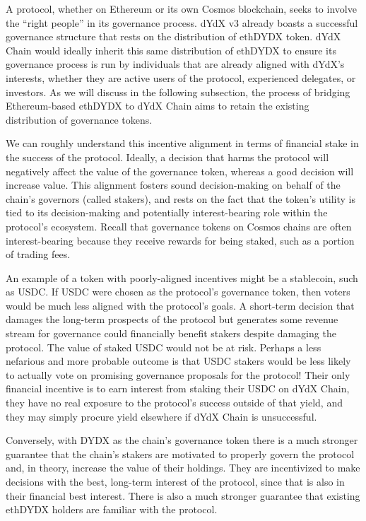         A protocol, whether on Ethereum or its own Cosmos blockchain, seeks to involve the ``right people'' in its governance process. dYdX v3 already boasts a successful governance structure that rests on the distribution of ethDYDX token. dYdX Chain would ideally inherit this same distribution of ethDYDX to ensure its governance process is run by individuals that are already aligned with dYdX's interests, whether they are active users of the protocol, experienced delegates, or investors. As we will discuss in the following subsection, the process of bridging Ethereum-based ethDYDX to dYdX Chain aims to retain the existing distribution of governance tokens.

        We can roughly understand this incentive alignment in terms of financial stake in the success of the protocol. Ideally, a decision that harms the protocol will negatively affect the value of the governance token, whereas a good decision will increase value. This alignment fosters sound decision-making on behalf of the chain's governors (called stakers), and rests on the fact that the token's utility is tied to its decision-making and potentially interest-bearing role within the protocol's ecosystem. Recall that governance tokens on Cosmos chains are often interest-bearing because they receive rewards for being staked, such as a portion of  trading fees. 
        
        An example of a token with poorly-aligned incentives might be a stablecoin, such as USDC. If USDC were chosen as the protocol's governance token, then voters would be much less aligned with the protocol's goals. A short-term decision that damages the long-term prospects of the protocol but generates some revenue stream for governance could financially benefit stakers despite damaging the protocol. The value of staked USDC would not be at risk. Perhaps a less nefarious and more probable outcome is that USDC stakers would be less likely to actually vote on promising governance proposals for the protocol! Their only financial incentive is to earn interest from staking their USDC on dYdX Chain, they have no real exposure to the protocol's success outside of that yield, and they may simply procure yield elsewhere if dYdX Chain is unsuccessful. 
        
        Conversely, with DYDX as the chain's governance token there is a much stronger guarantee that the chain's stakers are motivated to properly govern the protocol and, in theory, increase the value of their holdings. They are incentivized to make decisions with the best, long-term interest of the protocol, since that is also in their financial best interest. There is also a much stronger guarantee that existing ethDYDX holders are familiar with the protocol. 

